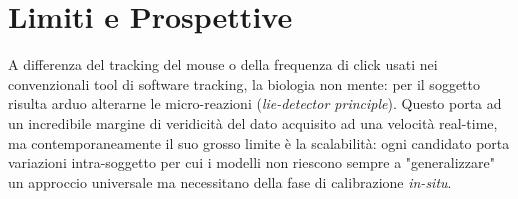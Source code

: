 \section{Limiti e Prospettive}
A differenza del tracking del mouse o della frequenza di click usati nei convenzionali tool di software tracking, la biologia non mente: per il soggetto risulta arduo alterarne le micro-reazioni (\textit{lie-detector principle}). Questo porta ad un incredibile margine di veridicità del dato acquisito ad una velocità real-time, ma contemporaneamente il suo grosso limite è la scalabilità: ogni candidato porta variazioni intra-soggetto per cui i modelli non riescono sempre a "generalizzare" un approccio universale ma necessitano della fase di calibrazione \textit{in-situ}.
